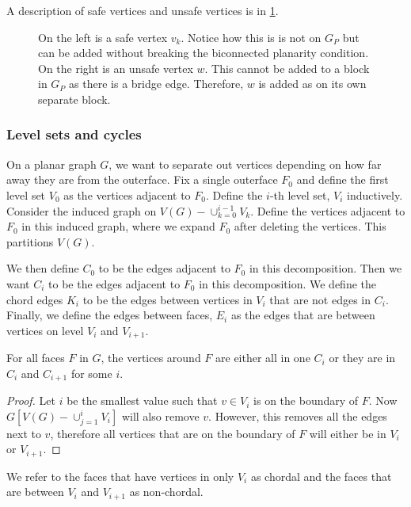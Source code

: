 A description of safe vertices and unsafe vertices is in \cref{fig:safe_vertices}.

\begin{figure}[h!]
	\centering
	
	\caption[Safe and unsafe vertices]{On the left is a safe vertex $v_k$. Notice how this is is not on $G_P$ but can be added without breaking the biconnected planarity condition. On the right is an unsafe vertex $w$. This cannot be added to a block in $G_P$ as there is a bridge edge. Therefore, $w$ is added as on its own separate block.}
	\label{fig:safe_vertices}
\end{figure}

\subsubsection{Level sets and cycles}
On a planar graph \(G\), we want to separate out vertices depending on how far away they are from the outerface. Fix a single outerface \(F_0\) and define the first level set \(V_0\) as the vertices adjacent to \(F_0\). Define the \(i\)-th level set, \(V_i\) inductively. Consider the induced graph on \(V(G) - \cup_{k = 0}^{i-1} V_k\). Define the vertices adjacent to \(F_0\) in this induced graph, where we expand \(F_0\) after deleting the vertices. This partitions \(V(G)\).

We then define \(C_0\) to be the edges adjacent to \(F_0\) in this decomposition. Then we want \(C_i\) to be the edges adjacent to \(F_0\) in this decomposition. We define the chord edges \(K_i\) to be the edges between vertices in \(V_i\) that are not edges in \(C_i\). Finally, we define the edges between faces, \(E_i\) as the edges that are between vertices on level \(V_i\) and \(V_{i + 1}\).

\begin{claim}
	For all faces \(F\) in \(G\), the vertices around \(F\) are either all in one \(C_i\) or they are in \(C_i\) and \(C_{i + 1}\) for some \(i\).
\end{claim}

\begin{proof}
	Let \(i\) be the smallest value such that \(v \in V_i\) is on the boundary of \(F\). Now \(G[V(G) - \cup_{j = 1}^{i} V_i]\) will also remove \(v\). However, this removes all the edges next to \(v\), therefore all vertices that are on the boundary of \(F\) will either be in \(V_i\) or \(V_{i + 1}\).
\end{proof}
We refer to the faces that have vertices in only \(V_i\) as chordal and the faces that are between \(V_i\) and \(V_{i + 1}\) as non-chordal.

